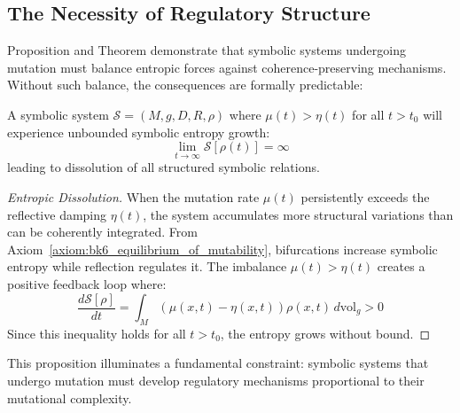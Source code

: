 \subsection{The Necessity of Regulatory Structure}
\label{subsection:bk6_the_necessity_of_regulatory_structure}
Proposition  and Theorem  demonstrate that symbolic systems undergoing mutation must balance entropic forces against coherence-preserving mechanisms. Without such balance, the consequences are formally predictable:
\begin{proposition}
\label{prop:bk6_entropic_dissolution}
A symbolic system $\mathcal{S} = (M, g, D, R, \rho)$ where $\mu(t) > \eta(t)$ for all $t > t_0$ will experience unbounded symbolic entropy growth:
\begin{equation}
\lim_{t \to \infty} \mathcal{S}[\rho(t)] = \infty
\end{equation}
leading to dissolution of all structured symbolic relations.
\begin{proof}[Entropic Dissolution]
\label{proof:bk6_entropic_dissolution}
When the mutation rate $\mu(t)$ persistently exceeds the reflective damping $\eta(t)$, the system accumulates more structural variations than can be coherently integrated.  
From Axiom~\ref{axiom:bk6_equilibrium_of_mutability}, bifurcations increase symbolic entropy while reflection regulates it.  
The imbalance $\mu(t) > \eta(t)$ creates a positive feedback loop where:
\[
\frac{d\mathcal{S}[\rho]}{dt} = \int_M (\mu(x,t) - \eta(x,t))\rho(x,t) \, d\text{vol}_g > 0
\]
Since this inequality holds for all \( t > t_0 \), the entropy grows without bound.
\end{proof}
\end{proposition}
This proposition illuminates a fundamental constraint: symbolic systems that undergo mutation must develop regulatory mechanisms proportional to their mutational complexity.
